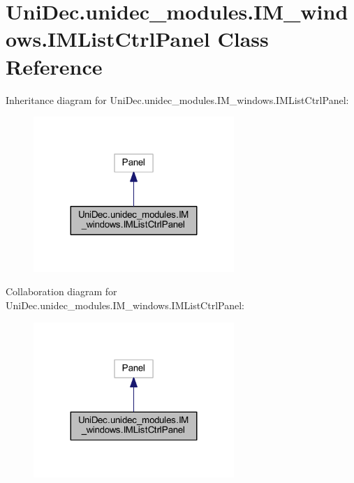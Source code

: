 \hypertarget{class_uni_dec_1_1unidec__modules_1_1_i_m__windows_1_1_i_m_list_ctrl_panel}{}\section{Uni\+Dec.\+unidec\+\_\+modules.\+I\+M\+\_\+windows.\+I\+M\+List\+Ctrl\+Panel Class Reference}
\label{class_uni_dec_1_1unidec__modules_1_1_i_m__windows_1_1_i_m_list_ctrl_panel}


Inheritance diagram for Uni\+Dec.\+unidec\+\_\+modules.\+I\+M\+\_\+windows.\+I\+M\+List\+Ctrl\+Panel\+:\nopagebreak
\begin{figure}[H]
\begin{center}
\leavevmode
\includegraphics[width=215pt]{class_uni_dec_1_1unidec__modules_1_1_i_m__windows_1_1_i_m_list_ctrl_panel__inherit__graph}
\end{center}
\end{figure}


Collaboration diagram for Uni\+Dec.\+unidec\+\_\+modules.\+I\+M\+\_\+windows.\+I\+M\+List\+Ctrl\+Panel\+:\nopagebreak
\begin{figure}[H]
\begin{center}
\leavevmode
\includegraphics[width=215pt]{class_uni_dec_1_1unidec__modules_1_1_i_m__windows_1_1_i_m_list_ctrl_panel__coll__graph}
\end{center}
\end{figure}
